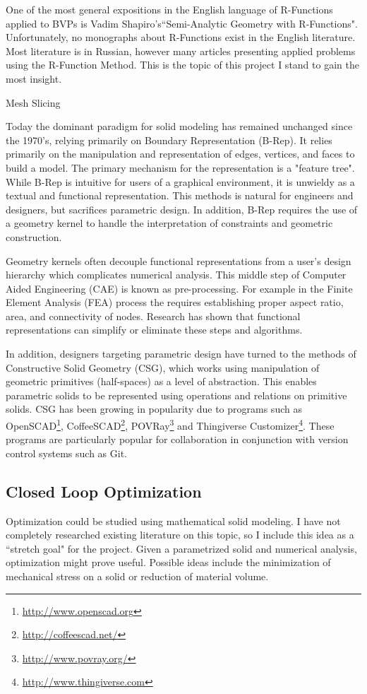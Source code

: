 \documentclass[a4paper]{article}
\begin{document}
One of the most general expositions in the English language of R-Functions
applied to BVPs is
Vadim Shapiro's``Semi-Analytic Geometry with R-Functions". \cite{shapiro2007semi}
Unfortunately, no monographs about R-Functions exist in the English literature.
Most literature is in Russian, however many articles presenting applied
problems using the R-Function Method. \cite{voron2010} This is the topic
of this project I stand to gain the most insight.


 Mesh Slicing




Today the dominant paradigm for solid modeling has remained unchanged since the 1970's, relying primarily on Boundary Representation (B-Rep). It relies primarily on the manipulation and representation of edges, vertices, and faces to build a model. The primary mechanism for the representation is a "feature tree". While B-Rep is intuitive for users of a graphical environment, it is unwieldy as a textual and functional representation.  This methods is natural for engineers and designers, but sacrifices parametric design. In addition, B-Rep requires the use of a geometry kernel to handle the interpretation of constraints and geometric construction. \cite{stroud2006boundary}

Geometry kernels often decouple functional representations from a user's design hierarchy which complicates numerical analysis.\cite{lee2005cad} This middle step of Computer Aided Engineering (CAE) is known as pre-processing. For example in the Finite Element Analysis (FEA) process the requires establishing proper aspect ratio, area, and connectivity of nodes. Research has shown that functional representations can simplify or eliminate these steps and algorithms.

In addition, designers targeting parametric design have turned to the methods of Constructive Solid Geometry (CSG), which works using manipulation of geometric primitives (half-spaces) as a level of abstraction. This enables parametric solids to be represented using operations and relations on primitive solids. CSG has been growing in popularity due to programs such as OpenSCAD\footnote{\url{http://www.openscad.org}}, CoffeeSCAD\footnote{\url{http://coffeescad.net/}}, POVRay\footnote{\url{http://www.povray.org/}} and Thingiverse Customizer\footnote{\url{http://www.thingiverse.com}}. These programs are particularly popular for collaboration in conjunction with version control systems such as Git.

\subsection{Closed Loop Optimization}
Optimization could be studied using mathematical solid modeling. I have not completely researched existing literature on this topic, so I include this idea as a ``stretch goal" for the project. Given a parametrized solid and numerical analysis, optimization might prove useful. Possible ideas include the minimization of mechanical stress on a solid or reduction of material volume.
\end{document}
